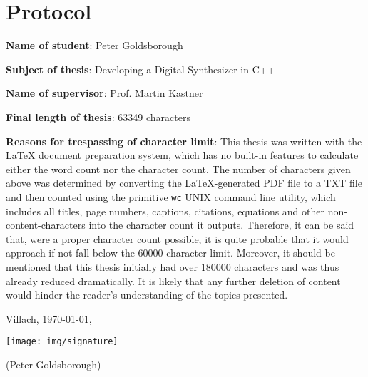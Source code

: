 \chapter*{Protocol}

\textbf{Name of student}: Peter Goldsborough \parbreak

\textbf{Subject of thesis}: Developing a Digital Synthesizer in C++ \parbreak

\textbf{Name of supervisor}: Prof. Martin Kastner \parbreak

\textbf{Final length of thesis}: 63349 characters \parbreak

\textbf{Reasons for trespassing of character limit}: This thesis was written with the \LaTeX{} document preparation system, which has no built-in features to calculate either the word count nor the character count. The number of characters given above was determined by converting the \LaTeX{}-generated PDF file to a TXT file and then counted using the primitive \texttt{wc} UNIX command line utility, which includes all titles, page numbers, captions, citations, equations and other non-content-characters into the character count it outputs. Therefore, it can be said that, were a proper character count possible, it is quite probable that it would approach if not fall below the 60000 character limit. Moreover, it should be mentioned that this thesis initially had over 180000 characters and was thus already reduced dramatically. It is likely that any further deletion of content would hinder the reader's understanding of the topics presented. \parbreak \parbreak \parbreak \parbreak

{ \centering

Villach, \today, \parbreak \parbreak \parbreak

\texttt{[image: img/signature]} \parbreak

(Peter Goldsborough) \parbreak \parbreak \parbreak

}

\pagebreak

